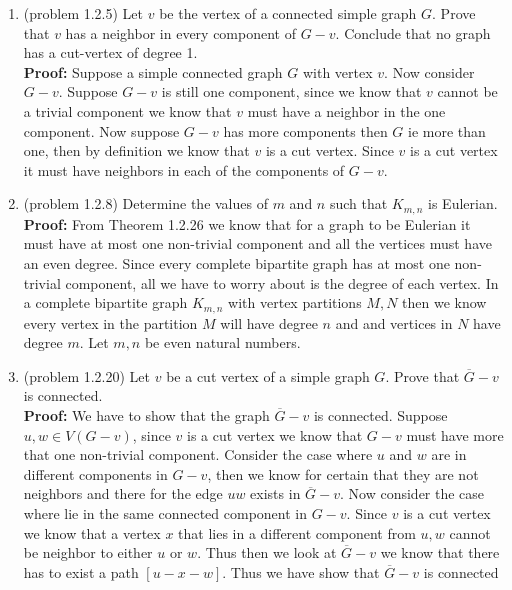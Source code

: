 \documentclass{amsart}
\begin{document}
\thispagestyle{fancy}
 
\begin{enumerate}
\item (problem 1.2.5) Let $v$ be the vertex of a connected simple graph $G.$ Prove that $v$ has a neighbor in every component of $G-v.$ Conclude that no graph has a cut-vertex of degree 1.\\

\textbf{Proof:} Suppose a simple connected graph $G$ with vertex $v$. Now consider $G-v$. Suppose $G-v$ is still one component, since we know that $v$ cannot be a trivial component we know that $v$ must have a neighbor in the one component. Now suppose $G-v$ has more components then $G$ ie more than one, then by definition we know that $v$ is a cut vertex. Since $v$ is a cut vertex it must have neighbors in each of the components of $G-v.$

\vspace{.5in}

\item (problem 1.2.8) Determine the values of $m$ and $n$ such that $K_{m,n}$ is Eulerian. \\

\textbf{Proof:} From Theorem 1.2.26 we know that for a graph to be Eulerian it must have at most one non-trivial component and all the vertices must have an even degree. Since every complete bipartite graph has at most one non-trivial component, all we have to worry about is the degree of each vertex. In a complete bipartite graph $K_{m,n}$ with vertex partitions $M,N$ then we know every vertex in the partition $M$ will have degree $n$ and and vertices in $N$ have degree $m$. Let $m,n$ be even natural numbers. 

\vspace{.5in}

\item (problem 1.2.20) Let $v$ be a cut vertex of a simple graph $G.$ Prove that $\overline{G}-v$ is connected.\\

\textbf{Proof:} 
We have to show that the graph $\overline{G}-v$ is connected. Suppose $u,w \in V(G-v)$, since $v$ is a cut vertex we know that $G-v$ must have more that one non-trivial component. Consider the case where $u$ and $w$ are in different components in $G-v$, then we know for certain that they are not neighbors and there for the edge $uw$ exists in $\overline{G} - v$. Now consider the case where lie in the same connected component in $G-v$. Since $v$ is a cut vertex we know that a vertex $x$ that lies in a different component from $u,w$ cannot be neighbor to either $u$ or $w$. Thus then we look at $\overline{G} - v$ we know that there has to exist a path $[u-x-w]$. Thus we have show that $\overline{G}-v$ is connected



\end{enumerate}
\end{document}
